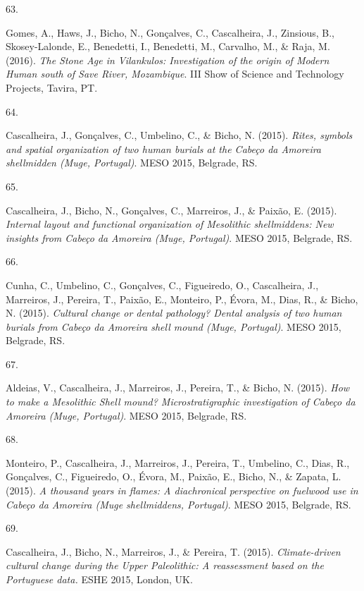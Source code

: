 \documentclass[11pt,a4paper,]{awesome-cv}
\newlength{\cslhangindent}
\newlength{\csllabelwidth}
\newenvironment{CSLReferences}[2] %
 {\begin{list}{}{%
  \setlength{\itemindent}{0pt}
  \setlength{\leftmargin}{0pt}
  \setlength{\parsep}{0pt}
  \ifodd #1
   \setlength{\leftmargin}{\cslhangindent}
   \setlength{\itemindent}{-1\cslhangindent}
  \fi
  \setlength{\itemsep}{#2\baselineskip}}}
 {\end{list}}
\newcommand{\CSLLeftMargin}[1]{\parbox[t]{\csllabelwidth}{\strut#1\strut}}
\newcommand{\CSLRightInline}[1]{\parbox[t]{\linewidth - \csllabelwidth}{\strut#1\strut}}
\begin{document}
\begin{CSLReferences}{0}{0}
\CSLLeftMargin{63. }%
\CSLRightInline{Gomes, A., Haws, J., Bicho, N., Gonçalves, C.,
Cascalheira, J., Zinsious, B., Skosey-Lalonde, E., Benedetti, I.,
Benedetti, M., Carvalho, M., \& Raja, M. (2016). \emph{The Stone Age in
Vilankulos: Investigation of the origin of Modern Human south of Save
River, Mozambique}. III Show of Science and Technology Projects, Tavira,
PT.}

\CSLLeftMargin{64. }%
\CSLRightInline{Cascalheira, J., Gonçalves, C., Umbelino, C., \& Bicho,
N. (2015). \emph{Rites, symbols and spatial organization of two human
burials at the Cabeço da Amoreira shellmidden (Muge, Portugal)}. MESO
2015, Belgrade, RS.}

\CSLLeftMargin{65. }%
\CSLRightInline{Cascalheira, J., Bicho, N., Gonçalves, C., Marreiros,
J., \& Paixão, E. (2015). \emph{Internal layout and functional
organization of Mesolithic shellmiddens: New insights from Cabeço da
Amoreira (Muge, Portugal)}. MESO 2015, Belgrade, RS.}

\CSLLeftMargin{66. }%
\CSLRightInline{Cunha, C., Umbelino, C., Gonçalves, C., Figueiredo, O.,
Cascalheira, J., Marreiros, J., Pereira, T., Paixão, E., Monteiro, P.,
Évora, M., Dias, R., \& Bicho, N. (2015). \emph{Cultural change or
dental pathology? Dental analysis of two human burials from Cabeço da
Amoreira shell mound (Muge, Portugal)}. MESO 2015, Belgrade, RS.}

\CSLLeftMargin{67. }%
\CSLRightInline{Aldeias, V., Cascalheira, J., Marreiros, J., Pereira,
T., \& Bicho, N. (2015). \emph{How to make a Mesolithic Shell mound?
Microstratigraphic investigation of Cabeço da Amoreira (Muge,
Portugal)}. MESO 2015, Belgrade, RS.}

\CSLLeftMargin{68. }%
\CSLRightInline{Monteiro, P., Cascalheira, J., Marreiros, J., Pereira,
T., Umbelino, C., Dias, R., Gonçalves, C., Figueiredo, O., Évora, M.,
Paixão, E., Bicho, N., \& Zapata, L. (2015). \emph{A thousand years in
flames: A diachronical perspective on fuelwood use in Cabeço da Amoreira
(Muge shellmiddens, Portugal)}. MESO 2015, Belgrade, RS.}

\CSLLeftMargin{69. }%
\CSLRightInline{Cascalheira, J., Bicho, N., Marreiros, J., \& Pereira,
T. (2015). \emph{Climate-driven cultural change during the Upper
Paleolithic: A reassessment based on the Portuguese data.} ESHE 2015,
London, UK.}


\end{CSLReferences}
\end{document}
